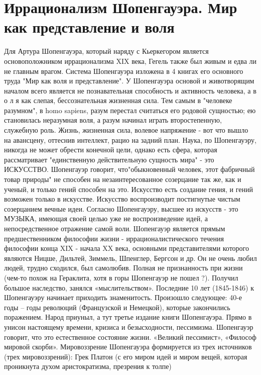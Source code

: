 \documentclass[12pt]{article}
\begin{document}
\section{Иррационализм Шопенгауэра. Мир как представление и воля}
Для Артура Шопенгауэра, который наряду с Кьеркегором является основоположником иррационализма XIX
века, Гегель также был живым и едва ли не главным врагом.
Система Шопенгауэра изложена в 4 книгах его основного труда "Мир как воля и представление".
У Шопенгауэра основой и животворящим началом всего является не познавательная способность и активность
человека, а в о л я как слепая, бессознательная жизненная сила. Тем самым в "человеке разумном", в homo
sapiens, разум перестал считаться его родовой сущностью; ею становилась неразумная воля, а разум начинал
играть второстепенную, служебную роль.
Жизнь, жизненная сила, волевое напряжение - вот что вышло на авансцену, оттеснив интеллект, рацио на
задний план.
Наука, по Шопенгауэру, никогда не может обрести конечной цели, однако есть сфера, которая рассматривает
"единственную действительную сущность мира" - это ИСКУССТВО. Шопенгауэр говорит, что"обыкновенный
человек, этот фабричный товар природы" не способен на незаинтересованное созерцание так же, как и ученый,
и только гений способен на это. Искусство есть создание гения, и гений возможен только в искусстве. Искусство
воспроизводит постигнутые чистым созерцанием вечные идеи.
Согласно Шопенгауэру, высшее из искусств - это МУЗЫКА, имеющая своей целью уже не воспроизведение
идей, а непосредственное отражение самой воли.
Шопенгауэр  является  прямым  предшественником  философии  жизни  -  иррационалистического  течения
философии конца XIX - начала XX века, основными представителями которого являются Ницше, Дильтей,
Зиммель, Шпенглер, Бергсон и др.
Он не очень любил людей, трудно сходился, был самолюбив. Полная не признанность при жизни (чем-то похож
на Гераклита, хотя в горы Шопенгауэр не пошел ?). Получил большое наследство, занялся «мыслительством».
Последние 10 лет (1845-1846) к Шопенгауэру начинает приходить знаменитость. Произошло следующее: 40-е
годы – годы революций (Французской и Немецкой), которые закончились поражением. Народ приуныл, а тут
третье  издание  книги  Шопенгауэра.  Прямо  в  унисон  настоящему  времени,  кризиса  и  безысходности,
пессимизма. Шопенгауэр говорит, что это естественное состояние жизни. «Великий пессимист», «Философ
мировой скорби».  Мировоззрение Шопенгауэра формируется из трех источников (трех мировоззрений):
Грек Платон (с его миром идей и миром вещей, которая проникнута духом аристократизма, презрения к толпе)
\end{document}
